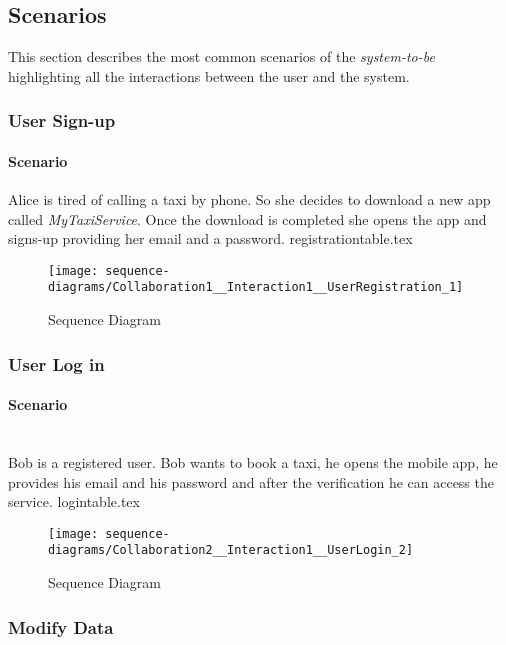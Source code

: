 
\subsection{Scenarios}
\label{sec:scenarios}
This section describes the most common scenarios of the \emph{system-to-be} highlighting all the interactions between the user and the system.

\subsubsection{User Sign-up} 
\label{ssub:sign_up_scenario}
\paragraph{Scenario} 
Alice is tired of calling a taxi by phone. So she decides to download a new app called \emph{MyTaxiService}.
Once the download is completed she opens the app and signs-up providing her email and a password.
\newpage
\vfill
{registrationtable.tex}
\vfill
\clearpage
\newpage
\vfill
\begin{figure}
\caption{Sequence Diagram}
\texttt{[image: sequence-diagrams/Collaboration1\_\_Interaction1\_\_UserRegistration\_1]}
\centering
\end{figure}
\vfill
\clearpage


\subsubsection{User Log in} 
\label{ssub:login_scenario}
\paragraph{Scenario} \hfill \\
Bob is a registered user. Bob wants to book a taxi, he opens the mobile app, he provides his email and his password and after the verification he can access the service.
{logintable.tex}
\newpage
\vfill
\begin{figure}
\caption{Sequence Diagram}
\texttt{[image: sequence-diagrams/Collaboration2\_\_Interaction1\_\_UserLogin\_2]}
\centering
\end{figure}
\vfill
\clearpage

\subsubsection{Modify Data} 
\label{ssub:modify_scenario}

